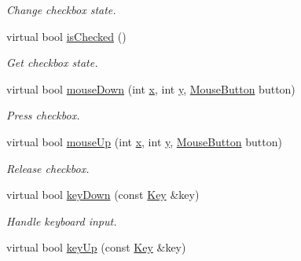 \begin{DoxyCompactItemize}
\begin{DoxyCompactList}\small\item\em Change checkbox state. \end{DoxyCompactList}\item 
\hypertarget{classGUI_1_1Checkbox_ae6c07622ee6c683df6f140f1e5f06dfe}{virtual bool \hyperlink{classGUI_1_1Checkbox_ae6c07622ee6c683df6f140f1e5f06dfe}{is\-Checked} ()}\label{classGUI_1_1Checkbox_ae6c07622ee6c683df6f140f1e5f06dfe}

\begin{DoxyCompactList}\small\item\em Get checkbox state. \end{DoxyCompactList}\item 
\hypertarget{classGUI_1_1Checkbox_a27484bdfecbfa9064e6484b9e572e20e}{virtual bool \hyperlink{classGUI_1_1Checkbox_a27484bdfecbfa9064e6484b9e572e20e}{mouse\-Down} (int \hyperlink{classGUI_1_1Window_a6ca6a80ca00c9e1d8ceea8d3d99a657d}{x}, int \hyperlink{classGUI_1_1Window_a0ee8e923aff2c3661fc2e17656d37adf}{y}, \hyperlink{namespaceGUI_ad06082a7b02aa73697f39eb8e0856de9}{Mouse\-Button} button)}\label{classGUI_1_1Checkbox_a27484bdfecbfa9064e6484b9e572e20e}

\begin{DoxyCompactList}\small\item\em Press checkbox. \end{DoxyCompactList}\item 
\hypertarget{classGUI_1_1Checkbox_a4f0122a87de58f0c1a899b5291959148}{virtual bool \hyperlink{classGUI_1_1Checkbox_a4f0122a87de58f0c1a899b5291959148}{mouse\-Up} (int \hyperlink{classGUI_1_1Window_a6ca6a80ca00c9e1d8ceea8d3d99a657d}{x}, int \hyperlink{classGUI_1_1Window_a0ee8e923aff2c3661fc2e17656d37adf}{y}, \hyperlink{namespaceGUI_ad06082a7b02aa73697f39eb8e0856de9}{Mouse\-Button} button)}\label{classGUI_1_1Checkbox_a4f0122a87de58f0c1a899b5291959148}

\begin{DoxyCompactList}\small\item\em Release checkbox. \end{DoxyCompactList}\item 
\hypertarget{classGUI_1_1Checkbox_a695bf64dfdd4086cd08f0cd1a7d4df4a}{virtual bool \hyperlink{classGUI_1_1Checkbox_a695bf64dfdd4086cd08f0cd1a7d4df4a}{key\-Down} (const \hyperlink{classGUI_1_1Key}{Key} \&key)}\label{classGUI_1_1Checkbox_a695bf64dfdd4086cd08f0cd1a7d4df4a}

\begin{DoxyCompactList}\small\item\em Handle keyboard input. \end{DoxyCompactList}\item 
\hypertarget{classGUI_1_1Checkbox_a90f6ed34b6aff02c7074637b1a2c3c2f}{virtual bool \hyperlink{classGUI_1_1Checkbox_a90f6ed34b6aff02c7074637b1a2c3c2f}{key\-Up} (const \hyperlink{classGUI_1_1Key}{Key} \&key)}\label{classGUI_1_1Checkbox_a90f6ed34b6aff02c7074637b1a2c3c2f}


\end{DoxyCompactItemize}
